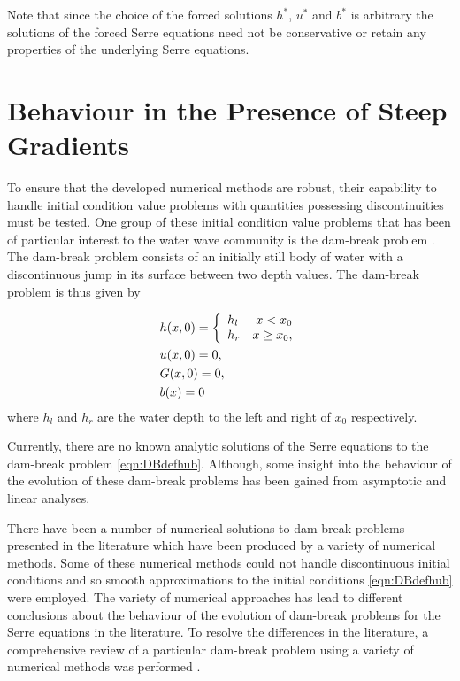 Note that since the choice of the forced solutions $h^*$, $u^*$ and $b^*$ is arbitrary the solutions of the forced Serre equations need not be conservative or retain any properties of the underlying Serre equations. 


\section{Behaviour in the Presence of Steep Gradients}
To ensure that the developed numerical methods are robust, their capability to handle initial condition value problems with quantities possessing discontinuities must be tested. One group of these initial condition value problems that has been of particular interest to the water wave community is the dam-break problem \cite{El-etal-2006,Hank-etal-2010-2034,Mitsotakis-etal-2014,Mitsotakis-etal-2017,doCarmo-etal-2018-404}. The dam-break problem consists of an initially still body of water with a discontinuous jump in its surface between two depth values. The dam-break problem is thus given by

\begin{subequations}
	\begin{align}
	&h(x,0) =\left\lbrace \begin{array}{l r}
	h_l & x < x_0 \\
	h_r & x \ge x_0,
	\end{array} \right. \\
	&u(x,0) = 0 , \\
	&G(x,0) = 0 , \\
	&b(x) = 0
	\end{align}
	\label{eqn:DBdefhub}
\end{subequations} 
where $h_l$ and $h_r$ are the water depth to the left and right of $x_0$ respectively. 

Currently, there are no known analytic solutions of the Serre equations to the dam-break problem \eqref{eqn:DBdefhub}. Although, some insight into the behaviour of the evolution of these dam-break problems has been gained from asymptotic \cite{El-etal-2006} and linear \cite{Dougalis-etal-2007} analyses. 

There have been a number of numerical solutions to dam-break problems presented in the literature \cite{El-etal-2006,Hank-etal-2010-2034,Mitsotakis-etal-2014,Mitsotakis-etal-2017,doCarmo-etal-2018-404} which have been produced by a variety of numerical methods. Some of these numerical methods could not handle discontinuous initial conditions \cite{El-etal-2006,Mitsotakis-etal-2014,Mitsotakis-etal-2017,doCarmo-etal-2018-404} and so smooth approximations to the initial conditions \eqref{eqn:DBdefhub} were employed. The variety of numerical approaches has lead to different conclusions about the behaviour of the evolution of dam-break problems for the Serre equations in the literature. To resolve the differences in the literature, a comprehensive review of a particular dam-break problem using a variety of numerical methods was performed \cite{Pitt-2018-61}.

